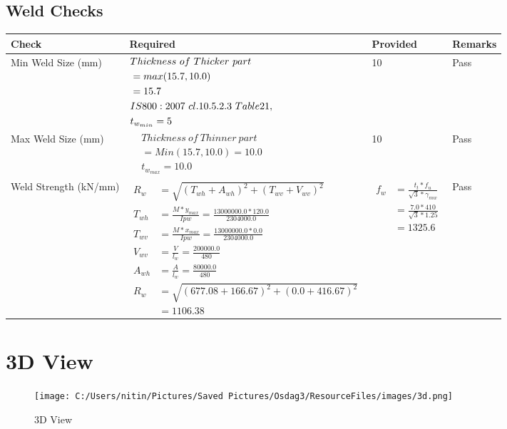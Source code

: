 \documentclass{article}%
\begin{document}
\subsection{Weld Checks}%
\label{subsec:WeldChecks}%
\renewcommand{\arraystretch}{1.2}%
\begin{longtable}{|p{4cm}|p{7.0cm}|p{3.5cm}|p{1.5cm}|}%
\hline%
\rowcolor{OsdagGreen}%
Check&Required&Provided&Remarks\\%
\hline%
\endhead%
\hline%
Min Weld Size (mm)&$\begin{aligned} &Thickness~of~Thicker~part\\ \noindent &=max(15.7,10.0)\\ &=15.7\\ &IS800:2007~cl.10.5.2.3~Table 21,\\  &t_{w_{min}}=5\end{aligned}$&10&Pass\\%
\hline%
Max Weld Size (mm)&$\begin{aligned} & Thickness~of~Thinner~part\\ &=Min(15.7,10.0)=10.0\\ &t_{w_{max}} =10.0\end{aligned}$&10&Pass\\%
\hline%
Weld Strength (kN/mm)&$\begin{aligned} R_w&=\sqrt{(T_{wh}+A_{wh})^2 + (T_{wv}+V_{wv})^2}\\ T_{wh}&=\frac{M*y_{max}}{I{pw}}=\frac{13000000.0*120.0}{2304000.0}\\ T_{wv}&=\frac{M*x_{max}}{I{pw}}=\frac{13000000.0*0.0}{2304000.0}\\ V_{wv}&=\frac{V}{l_w}=\frac{200000.0}{480}\\ A_{wh}&=\frac{A}{l_w}=\frac{80000.0}{480}\\ R_w&=\sqrt{(677.08+166.67)^2 + (0.0+416.67)^2}\\ &=1106.38\end{aligned}$&$\begin{aligned} f_w &=\frac{t_t*f_u}{\sqrt{3}*\gamma_{mw}}\\ &=\frac{7.0*410}{\sqrt{3}*1.25}\\ &=1325.6\end{aligned}$&Pass\\%
\hline%
\end{longtable}

%
%
\newpage%
\section{3D View}%
\label{sec:3DView}%


\begin{figure}[h!]%
\centering%
\texttt{[image: C:/Users/nitin/Pictures/Saved Pictures/Osdag3/ResourceFiles/images/3d.png]}%
\caption{3D View}%
\end{figure}

%
\end{document}
